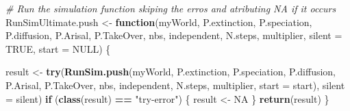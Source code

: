 \documentclass[]{book}
\newenvironment{Shaded}{\begin{snugshade}}{\end{snugshade}}
\newcommand{\KeywordTok}[1]{\textcolor[rgb]{0.13,0.29,0.53}{\textbf{{#1}}}}
\newcommand{\DataTypeTok}[1]{\textcolor[rgb]{0.13,0.29,0.53}{{#1}}}
\newcommand{\StringTok}[1]{\textcolor[rgb]{0.31,0.60,0.02}{{#1}}}
\newcommand{\CommentTok}[1]{\textcolor[rgb]{0.56,0.35,0.01}{\textit{{#1}}}}
\newcommand{\OtherTok}[1]{\textcolor[rgb]{0.56,0.35,0.01}{{#1}}}
\newcommand{\ControlFlowTok}[1]{\textcolor[rgb]{0.13,0.29,0.53}{\textbf{{#1}}}}
\newcommand{\OperatorTok}[1]{\textcolor[rgb]{0.81,0.36,0.00}{\textbf{{#1}}}}
\newcommand{\NormalTok}[1]{{#1}}
\theoremstyle{definition}
\theoremstyle{definition}
\theoremstyle{definition}
\theoremstyle{remark}
\begin{document}
\begin{Shaded}
\begin{Highlighting}[]
\CommentTok{# Run the simulation function skiping the erros and atributing NA if it occurs}
\NormalTok{RunSimUltimate.push <-}\StringTok{ }\ControlFlowTok{function}\NormalTok{(myWorld, P.extinction, P.speciation,}
\NormalTok{                                P.diffusion, P.Arisal, P.TakeOver, nbs, independent,}
\NormalTok{                                N.steps, multiplier,}
                                \DataTypeTok{silent =} \OtherTok{TRUE}\NormalTok{, }\DataTypeTok{start =} \OtherTok{NULL}\NormalTok{) \{}

\NormalTok{  result <-}\StringTok{ }\KeywordTok{try}\NormalTok{(}\KeywordTok{RunSim.push}\NormalTok{(myWorld, P.extinction, P.speciation,}
\NormalTok{                            P.diffusion, P.Arisal, P.TakeOver, nbs,}
\NormalTok{                            independent, N.steps,}
\NormalTok{                            multiplier, }\DataTypeTok{start =}\NormalTok{ start), }\DataTypeTok{silent =}\NormalTok{ silent)}
  \ControlFlowTok{if}\NormalTok{ (}\KeywordTok{class}\NormalTok{(result) }\OperatorTok{==}\StringTok{ "try-error"}\NormalTok{) \{}
\NormalTok{    result <-}\StringTok{ }\OtherTok{NA}
\NormalTok{  \}}
  \KeywordTok{return}\NormalTok{(result)}
\NormalTok{\}}
\end{Highlighting}
\end{Shaded}
\end{document}
